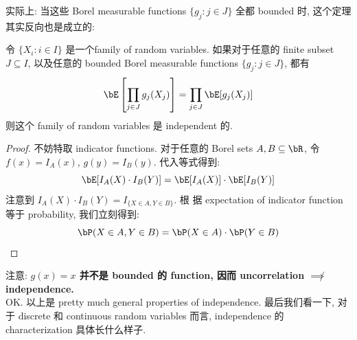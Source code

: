 实际上: 当这些 Borel measurable functions \(\{g_j: j \in J\}\) 
全都 bounded 时, 这个定理其实反向也是成立的:
\begin{theorem}
    令 \(\{X_i: i \in I\}\) 是一个family of random variables.
    如果对于任意的 finite subset \(J \subseteq I\), 以及任意的
     bounded Borel measurable functions \(\{g_j: j \in J\}\), 都有
    \[
    \bE\left[\prod_{j\in J} g_j(X_j)\right] = \prod_{j\in J} \bE[g_j(X_j)]
    \]
    则这个 family of random variables 是 independent 的.
\end{theorem}
\begin{proof}
不妨特取 indicator functions.
对于任意的 Borel sets $A, B \subseteq \bR$, 
令 $f(x) = I_A(x)$, $g(y) = I_B(y)$.
代入等式得到:$$\bE[I_A(X) \cdot I_B(Y)] = \bE[I_A(X)] \cdot \bE[I_B(Y)]$$
注意到 $I_A(X) \cdot I_B(Y) = I_{\{X \in A, Y \in B\}}$. 根
据 expectation of indicator function 等于 probability,
我们立刻得到:$$\bP(X \in A, Y \in B) = \bP(X \in A) \cdot \bP(Y \in B)$$
\end{proof}
注意:\textbf{ \(g(x) = x\) 并不是 bounded 的 function, 因而 uncorrelation $\not \implies$ independence.}\\


OK. 以上是 pretty much general properties of independence. 
最后我们看一下, 对于 discrete 和 continuous random variables 而言, 
independence 的 characterization 具体长什么样子.






